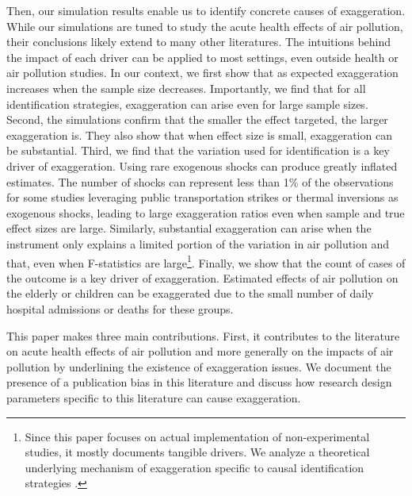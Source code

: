 \documentclass[12pt]{article}
\begin{document}
    Then, our simulation results enable us to identify concrete causes of exaggeration. While our simulations are tuned to study the acute health effects of air pollution, their conclusions likely extend to many other literatures. The intuitions behind the impact of each driver can be applied to most settings, even outside health or air pollution studies. In our context, we first show that as expected exaggeration increases when the sample size decreases. Importantly, we find that for all identification strategies, exaggeration can arise even for large sample sizes. Second, the simulations confirm that the smaller the effect targeted, the larger exaggeration is. They also show that when effect size is small, exaggeration can be substantial. Third, we find that the variation used for identification is a key driver of exaggeration. Using rare exogenous shocks can produce greatly inflated estimates. The number of shocks can represent less than 1\% of the observations for some studies leveraging public transportation strikes or thermal inversions as exogenous shocks, leading to large exaggeration ratios even when sample and true effect sizes are large. Similarly, substantial exaggeration can arise when the instrument only explains a limited portion of the variation in air pollution and that, even when F-statistics are large\footnote{Since this paper focuses on actual implementation of non-experimental studies, it mostly documents tangible drivers. We analyze a theoretical underlying mechanism of exaggeration specific to causal identification strategies \citep{bagilet_causal_inflation_2022}.}.
    Finally, we show that the count of cases of the outcome is a key driver of exaggeration. Estimated effects of air pollution on the elderly or children can be exaggerated due to the small number of daily hospital admissions or deaths for these groups.


    This paper makes three main contributions. First, it contributes to the literature on acute health effects of air pollution and more generally on the impacts of air pollution by underlining the existence of exaggeration issues. We document the presence of a publication bias in this literature and discuss how research design parameters specific to this literature can cause exaggeration. 
\end{document}
